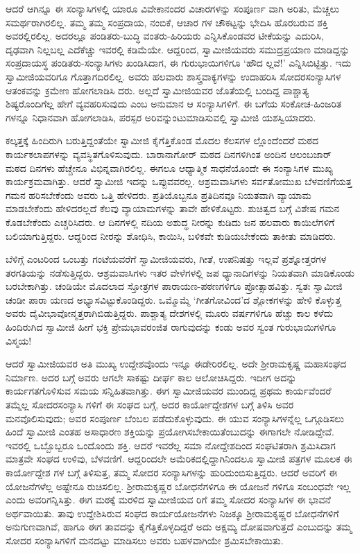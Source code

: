 ಆದರೆ ಆಗಿನ್ನೂ ಈ ಸಂನ್ಯಾಸಿಗಳಲ್ಲಿ ಯಾರೂ ವಿವೇಕಾನಂದರ ವಿಚಾರಗಳನ್ನು ಸಂಪೂರ್ಣ ವಾಗಿ ಅರಿತು, ಮೆಚ್ಚಲು ಸಮರ್ಥರಾಗಿರಲಿಲ್ಲ. ತಮ್ಮ ತಮ್ಮ ಸಂಪ್ರದಾಯ, ನಂಬಿಕೆ, ಆಚಾರ ಗಳ ಚೌಕಟ್ಟನ್ನು ಭೇದಿಸಿ ಹೊರಬರುವ ಶಕ್ತಿ ಅವರಲ್ಲಿರಲಿಲ್ಲ. ಅದರಲ್ಲೂ ಪಂಡಿತರು-ಬುದ್ಧಿ ವಂತರು-ಹಿರಿಯರು ಎನ್ನಿಸಿಕೊಂಡವರ ಟೀಕೆಯನ್ನು ಎದುರಿಸಿ, ದೃಢವಾಗಿ ನಿಲ್ಲಬಲ್ಲ ಎದೆಕೆಚ್ಚು ಇವರಲ್ಲಿ ಕಡಿಮೆಯೇ. ಆದ್ದರಿಂದ, ಸ್ವಾಮೀಜಿಯವರು ಸಮುದ್ರಪ್ರಯಾಣ ಮಾಡಿದ್ದನ್ನು ಸಂಪ್ರದಾಯಸ್ಥ ಪಂಡಿತರು-ಸಂನ್ಯಾಸಿಗಳು ಖಂಡಿಸಿದಾಗ, ಈ ಗುರುಭಾಯಿಗಳಿಗೂ ‘ಹೌದ ಲ್ಲವೆ!’ ಎನ್ನಿಸಿಬಿಟ್ಟಿತ್ತು. ಇದು ಸ್ವಾಮೀಜಿಯವರಿಗೂ ಗೊತ್ತಾಗದಿರಲಿಲ್ಲ. ಅವರು ಹಲವಾರು ಶಾಸ್ತ್ರವಾಕ್ಯಗಳನ್ನು ಉದಾಹರಿಸಿ ಸೋದರಸಂನ್ಯಾಸಿಗಳ ಆತಂಕವನ್ನು ಕ್ರಮೇಣ ಹೋಗಲಾಡಿಸಿ ದರು. ಅಲ್ಲದೆ ಸ್ವಾಮೀಜಿಯವರ ಜೊತೆಯಲ್ಲಿ ಬಂದಿದ್ದ ಪಾಶ್ಚಾತ್ಯ ಶಿಷ್ಯರೊಂದಿಗೆಲ್ಲ ಹೇಗೆ ವ್ಯವಹರಿಸುವುದು ಎಂಬ ಅನುಮಾನ ಆ ಸಂನ್ಯಾಸಿಗಳಿಗೆ. ಈ ಬಗೆಯ ಸಂಕೋಚ-ಹಿಂಜರಿತ ಗಳನ್ನೂ ನಿಧಾನವಾಗಿ ಹೋಗಲಾಡಿಸಿ, ಪರಸ್ಪರ ಅರಿವನ್ನುಂಟುಮಾಡಿಸುವಲ್ಲಿ ಸ್ವಾಮೀಜಿ ಯಶಸ್ವಿಯಾದರು.

ಕಲ್ಕತ್ತಕ್ಕೆ ಹಿಂದಿರುಗಿ ಬರುತ್ತಿದ್ದಂತೆಯೇ ಸ್ವಾಮೀಜಿ ಕೈಗೆತ್ತಿಕೊಂಡ ಮೊದಲ ಕೆಲಸಗಳ ಲ್ಲೊಂದೆಂದರೆ ಮಠದ ಕಾರ್ಯಕಲಾಪಗಳನ್ನು ವ್ಯವಸ್ಥಿತಗೊಳಿಸುವುದು. ಬಾರಾನಾಗೋರ್ ಮಠದ ದಿನಗಳಿಗಿಂತ ಅಂದಿನ ಆಲಂಬಜಾರ್ ಮಠದ ದಿನಗಳು ಹೆಚ್ಚೇನೂ ವಿಭಿನ್ನವಾಗಿರಲಿಲ್ಲ. ಈಗಲೂ ಆಧ್ಯಾತ್ಮಿಕ ಸಾಧನೆಯೊಂದೇ ಈ ಸಂನ್ಯಾಸಿಗಳ ಮುಖ್ಯ ಕಾರ್ಯಕ್ರಮವಾಗಿತ್ತು. ಆದರೆ ಸ್ವಾಮೀಜಿ ಇದನ್ನು ಒಪ್ಪುವವರಲ್ಲ. ಆಶ್ರಮವಾಸಿಗಳು ಸರ್ವತೋಮುಖ ಬೆಳವಣಿಗೆಯತ್ತ ಗಮನ ಹರಿಸಬೇಕೆಂದು ಅವರು ಒತ್ತಿ ಹೇಳಿದರು. ಪ್ರತಿಯೊಬ್ಬನೂ ಪ್ರತಿದಿನವೂ ನಿಯತವಾಗಿ ವ್ಯಾಯಾಮ ಮಾಡಬೇಕೆಂದು ಹೇಳಿದರಲ್ಲದೆ ಕೆಲವು ವ್ಯಾಯಾಮಗಳನ್ನು ತಾವೇ ಹೇಳಿಕೊಟ್ಟರು. ಶುಚಿತ್ವದ ಬಗ್ಗೆ ವಿಶೇಷ ಗಮನ ಕೊಡಬೇಕೆಂದು ಎಚ್ಚರಿಸಿದರು. ಆ ದಿನಗಳಲ್ಲಿ ನದಿಯ ಅಶುದ್ಧ ನೀರನ್ನು ಕುಡಿದು ಜನ ಹಲವಾರು ಕಾಯಿಲೆಗಳಿಗೆ ಬಲಿಯಾಗುತ್ತಿದ್ದರು. ಆದ್ದರಿಂದ ನೀರನ್ನು ಶೋಧಿಸಿ, ಕಾಯಿಸಿ, ಬಳಿಕವೇ ಕುಡಿಯಬೇಕೆಂದು ತಾಕೀತು ಮಾಡಿದರು.

ಬೆಳಿಗ್ಗೆ ಎಂಟರಿಂದ ಒಂಬತ್ತು ಗಂಟೆಯವರೆಗೆ ಸ್ವಾಮೀಜಿಯವರು, ಗೀತೆ, ಉಪನಿಷತ್ತು ಇಲ್ಲವೆ ಪ್ರಶ್ನೋತ್ತರಗಳ ತರಗತಿಯನ್ನು ನಡೆಸುತ್ತಿದ್ದರು. ಆಶ್ರಮವಾಸಿಗಳು ಇತರ ವೇಳೆಗಳಲ್ಲಿ ಜಪ ಧ್ಯಾನಾದಿಗಳನ್ನು ನಿಯತವಾಗಿ ಮಾಡಿಕೊಂಡು ಬರಬೇಕಾಗಿತ್ತು. ಚಂಡಿಯೇ ಮೊದಲಾದ ಸ್ತೋತ್ರಗಳ ಪಾರಾಯಣ-ಪಠಣಗಳಿಗೂ ಪ್ರೋತ್ಸಾಹವಿತ್ತು. ಸ್ವತಃ ಸ್ವಾಮೀಜಿ ಚಂಡೀ ಪಾರಾ ಯಣದ ಅಭ್ಯಾಸವಿಟ್ಟುಕೊಂಡಿದ್ದರು. ಒಮ್ಮೊಮ್ಮೆ ‘ಗೀತಗೋವಿಂದ’ದ ಶ್ಲೋಕಗಳನ್ನು ಹೇಳಿ ಕೊಳ್ಳುತ್ತ ಅವರು ದೈವೀಭಾವೋನ್ಮತ್ತರಾಗಿಬಿಡುತ್ತಿದ್ದರು. ಪಾಶ್ಚಾತ್ಯ ದೇಶಗಳಲ್ಲಿ ಮೂರು ವರ್ಷಗಳಿಗೂ ಹೆಚ್ಚು ಕಾಲ ಕಳೆದು ಹಿಂದಿರುಗಿದ ಸ್ವಾಮೀಜಿ ಹೀಗೆ ಭಕ್ತಿ ಪ್ರೇಮಭಾವರಂಜಿತ ರಾಗುವುದನ್ನು ಕಂಡು ಅವರ ಸ್ವಂತ ಗುರುಭಾಯಿಗಳಿಗೂ ವಿಸ್ಮಯ!

ಆದರೆ ಸ್ವಾಮೀಜಿಯವರ ಅತಿ ಮುಖ್ಯ ಉದ್ದೇಶವೊಂದು ಇನ್ನೂ ಈಡೇರಿರಲಿಲ್ಲ. ಅದೇ ಶ್ರೀರಾಮಕೃಷ್ಣ ಮಹಾಸಂಘದ ನಿರ್ಮಾಣ. ಅದರ ಬಗ್ಗೆ ಅವರು ಆಗಲೇ ಸಾಕಷ್ಟು ದೀರ್ಘ ಕಾಲ ಆಲೋಚಿಸಿದ್ದರು. ಇದೀಗ ಅದನ್ನು ಕಾರ್ಯಗತಗೊಳಿಸುವ ಸಮಯ ಸನ್ನಿಹಿತವಾಗಿತ್ತು. ಈಗ ಸ್ವಾಮೀಜಿಯವರ ಮುಂದಿದ್ದ ಪ್ರಥಮ ಕಾರ್ಯವೆಂದರೆ ತಮ್ಮೆಲ್ಲ ಸೋದರಸಂನ್ಯಾಸಿ ಗಳಿಗೆ ಈ ಸಂಘದ ಬಗ್ಗೆ, ಅದರ ಕಾರ್ಯೋದ್ದೇಶಗಳ ಬಗ್ಗೆ ತಿಳಿಸಿ ಅವರ ಮನವೊಲಿಸುವುದು; ಅವರ ಸಂಪೂರ್ಣ ಬೆಂಬಲ ಪಡೆದುಕೊಳ್ಳುವುದು. ಈ ಯುವ ಸಂನ್ಯಾಸಿಗಳನ್ನೆಲ್ಲ ಒಗ್ಗೂಡಿಸಲು ಹಿಂದೆ ಸ್ವಾಮೀಜಿ ಎಂತಹ ಅಸಾಧಾರಣ ಶಕ್ತಿಯನ್ನು ಪ್ರಯೋಗಿಸಬೇಕಾಯಿತೆಂಬುದನ್ನು ಈಗಾಗಲೇ ನೋಡಿದ್ದೇವೆ. ಇವರಲ್ಲಿ ಒಬ್ಬೊಬ್ಬರೂ ಒಂದೊಂದು ಶಕ್ತಿ. ಆದರೆ ಇವರೆಲ್ಲ ಸಮಾ ನೋದ್ದೇಶದಿಂದ ಸಂಘಟಿತರಾಗಿ ಶ್ರಮಿಸಿದಾಗ ಮಾತ್ರವೇ ಸಂಘದ ಉಳಿವು, ಬೆಳವಣಿಗೆ. ಆದ್ದರಿಂದಲೇ ಅಮೆರಿಕದಲ್ಲಿದ್ದಾಗಿನಿಂದಲೂ ಸ್ವಾಮೀಜಿ ಪತ್ರಗಳ ಮೂಲಕ ಈ ಕಾರ್ಯೋದ್ದೇಶ ಗಳ ಬಗ್ಗೆ ತಿಳಿಸುತ್ತ, ತಮ್ಮ ಸೋದರ ಸಂನ್ಯಾಸಿಗಳನ್ನು ಹುರಿದುಂಬಿಸುತ್ತಿದ್ದರು. ಆದರೆ ಅವರಿಗೆ ಈ ಯೋಜನೆಗಳೆಲ್ಲ ಅಷ್ಟೇನೂ ರುಚಿಸಲಿಲ್ಲ. ಶ್ರೀರಾಮಕೃಷ್ಣರ ಬೋಧನೆಗಳಿಗೂ ಈ ಯೋಜನೆ ಗಳಿಗೂ ಸಂಬಂಧವೇ ಇಲ್ಲ ಎಂದು ಅವರಿಗನ್ನಿಸಿತ್ತು. ಈಗ ಮಠಕ್ಕೆ ಮರಳಿದ ಸ್ವಾಮೀಜಿಯವ ರಿಗೆ ತಮ್ಮ ಸೋದರ ಸಂನ್ಯಾಸಿಗಳ ಈ ಭಾವನೆ ಅರ್ಥವಾಯಿತು. ತಾವು ಉದ್ದೇಶಿಸಿರುವ ಸಂಘದ ಕಾರ್ಯಯೋಜನೆಗಳು ನಿಜಕ್ಕೂ ಶ್ರೀರಾಮಕೃಷ್ಣರ ಬೋಧನೆಗಳಿಗೆ ಅನುಗುಣವಾಗಿವೆ, ಹಾಗೂ ಈಗ ತಾವದನ್ನು ಕೈಗೆತ್ತಿಕೊಳ್ಳದಿದ್ದರೆ ಅದು ಅಕ್ಷಮ್ಯ ದೋಷವಾಗುತ್ತದೆ ಎಂಬುದನ್ನು ತಮ್ಮ ಸೋದರ ಸಂನ್ಯಾಸಿಗಳಿಗೆ ಮನದಟ್ಟು ಮಾಡಿಸಲು ಅವರು ಬಹಳವಾಗಿಯೇ ಶ್ರಮಿಸಬೇಕಾಯಿತು.

